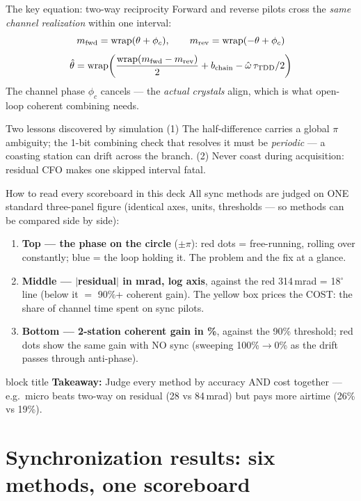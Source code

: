 \documentclass[aspectratio=169,10pt]{beamer}
\newcommand{\takeaway}[1]{%
  \vspace{2pt}\begin{beamercolorbox}[rounded=true,sep=4pt]{block title}%
  \small\textbf{Takeaway:} #1\end{beamercolorbox}}
\begin{document}
\begin{frame}{The key equation: two-way reciprocity}
  \small Forward and reverse pilots cross the \emph{same channel
  realization} within one interval:
  \[
    m_{\rm fwd}=\mathrm{wrap}(\theta+\phi_c),\qquad
    m_{\rm rev}=\mathrm{wrap}(-\theta+\phi_c)
  \]
  \[
    \hat\theta=\mathrm{wrap}\!\left(
      \frac{\mathrm{wrap}(m_{\rm fwd}-m_{\rm rev})}{2}
      + b_{\rm chain} - \hat\omega\,\tau_{\rm TDD}/2\right)
  \]
  The channel phase $\phi_c$ cancels --- the \emph{actual crystals}
  align, which is what open-loop coherent combining needs.
  \begin{block}{\small Two lessons discovered by simulation}
    \small (1) The half-difference carries a global $\pi$ ambiguity;
    the 1-bit combining check that resolves it must be
    \emph{periodic} --- a coasting station can drift across the
    branch. (2) Never coast during acquisition: residual CFO makes
    one skipped interval fatal.
  \end{block}
\end{frame}

\begin{frame}{How to read every scoreboard in this deck}
  \small All sync methods are judged on ONE standard three-panel
  figure (identical axes, units, thresholds --- so methods can be
  compared side by side):
  \begin{enumerate}
    \item \textbf{Top --- the phase on the circle} ($\pm\pi$): red
      dots = free-running, rolling over constantly; blue = the loop
      holding it. The problem and the fix at a glance.
    \item \textbf{Middle --- $|$residual$|$ in mrad, log axis},
      against the red 314\,mrad = 18$^\circ$ line (below it $=$
      90\%+ coherent gain). The yellow box prices the COST: the
      share of channel time spent on sync pilots.
    \item \textbf{Bottom --- 2-station coherent gain in \%}, against
      the 90\% threshold; red dots show the same gain with NO sync
      (sweeping 100\%$\to$0\% as the drift passes through
      anti-phase).
  \end{enumerate}
  \takeaway{Judge every method by accuracy AND cost together ---
  e.g.\ micro beats two-way on residual (28 vs 84\,mrad) but pays
  more airtime (26\% vs 19\%).}
\end{frame}

\section{Synchronization results: six methods, one scoreboard}
\end{document}
